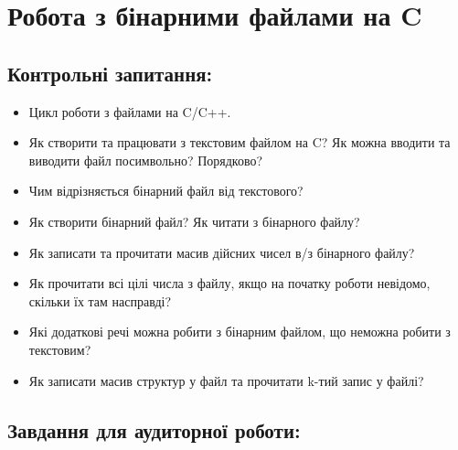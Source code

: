\documentclass[a5paper,titlepage,openany,twoside,draft]{book_unv}%
\begin{document}
\chapter{Робота з бінарними файлами на C}
%

\section{Контрольні запитання:}
\begin{itemize}
\item
  Цикл роботи з файлами на C/C++.
\item
  Як створити та працювати з текстовим файлом на C? Як можна вводити та
  виводити файл посимвольно? Порядково?
\item
  Чим відрізняється бінарний файл від текстового? 
\item 
  Як створити бінарний файл? Як читати з бінарного файлу?
\item
  Як записати та прочитати масив дійсних чисел в/з бінарного файлу?
\item
  Як прочитати всі цілі числа з файлу, якщо на початку роботи невідомо,
  скільки їх там насправді?
\item
  Які додаткові речі можна робити з бінарним файлом, що неможна робити з
  текстовим?
\item
  Як записати масив структур у файл та прочитати k-тий запис у файлі?
\end{itemize}

\section{Завдання для аудиторної роботи:}
\end{document}
